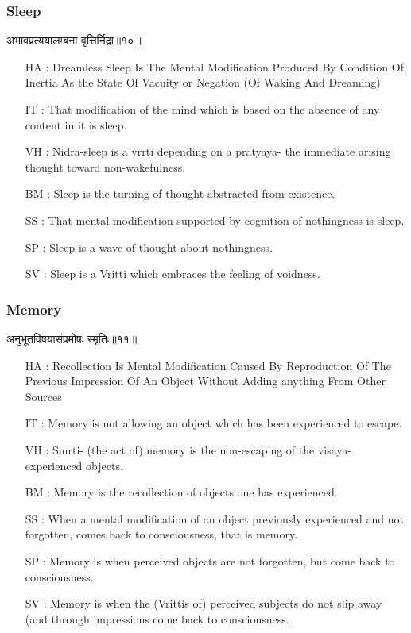 \begin{frame}[fragile]\frametitle{Sleep}
\begin{sanskrit}
अभावप्रत्ययालम्बना वृत्तिर्निद्रा॥१०॥
\end{sanskrit}
	\begin{itemize}
	\item [HA]: Dreamless Sleep Is The Mental Modification Produced By Condition Of Inertia As the State Of Vacuity or Negation (Of Waking And Dreaming)
	\item [IT]: That modification of the mind which is based on the absence of any content in it is sleep.
	\item [VH]: Nidra-sleep is a vrrti depending on a pratyaya- the immediate arising thought toward non-wakefulness.
	\item [BM]: Sleep is the turning of thought abstracted from existence.
	\item [SS]: That mental modification supported by cognition of nothingness is sleep.
	\item [SP]: Sleep is a wave of thought about nothingness.
	\item [SV]: Sleep is a Vritti which embraces the feeling of voidness. 
	\end{itemize}
\end{frame}


\begin{frame}[fragile]\frametitle{Memory}
\begin{sanskrit}
अनुभूतविषयासंप्रमोषः स्मृतिः॥११॥
\end{sanskrit}

	\begin{itemize}
	\item [HA]: Recollection Is Mental Modification Caused By Reproduction Of The Previous Impression Of An Object Without Adding anything From Other Sources
	\item [IT]: Memory is not allowing an object which has been experienced to escape.
	\item [VH]: Smrti- (the act of) memory is the non-escaping of the visaya-experienced objects.
	\item [BM]: Memory is the recollection of objects one has experienced.
	\item [SS]: When a mental modification of an object previously experienced and not forgotten, comes back to consciousness, that is memory.
	\item [SP]: Memory is when perceived objects are not forgotten, but come back to consciousness.
	\item [SV]: Memory is when the (Vrittis of) perceived subjects do not slip away (and through impressions come back to consciousness. 
	\end{itemize}
\end{frame}


